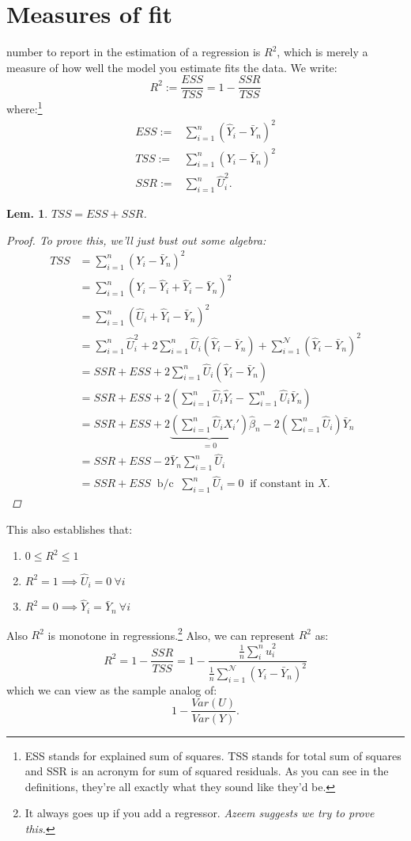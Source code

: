\documentclass{tufte-book}
\theoremstyle{mytheoremstyle}
\theoremstyle{mylemstyle}
\newtheorem*{lem}{Lem.}
\theoremstyle{mydefstyle}
\begin{document}
\section{Measures of fit}
 number to report in the estimation of a regression is \(R^2\), which is merely a measure of how well the model you estimate fits the data. We write:
	\[R^2 := \frac{ESS}{TSS} = 1- \frac{SSR}{TSS}\]
where:\footnote{ESS stands for explained sum of squares. TSS stands for total sum of squares and SSR is an acronym for sum of squared residuals. As you can see in the definitions, they're all exactly what they sound like they'd be.}
	\begin{align*}
		ESS := & \sum_{i=1}^n(\hat{Y}_i - \bar{Y}_n)^2 \\
		TSS := & \sum_{i=1}^n(Y_i - \bar{Y}_n)^2 \\
		SSR := & \sum_{i=1}^n \hat{U}_i^2  \text{.}
	\end{align*}
\begin{lem} \(TSS = ESS + SSR\).
\begin{proof}
	To prove this, we'll just bust out some algebra:
		\begin{align*}
			TSS & = \sum_{i=1}^n(Y_i - \bar{Y}_n)^2 \\
				& = \sum_{i=1}^n(Y_i - \hat{Y}_i + \hat{Y}_i - \bar{Y}_n)^2 \\
				& = \sum_{i=1}^n(\hat{U}_i + \hat{Y}_i - \bar{Y}_n)^2 \\
				& = \sum_{i=1}^n\hat{U}_i^2 + 2\sum_{i=1}^n \hat{U}_i(\hat{Y}_i - \bar{Y}_n) + \sum_{i=1}^\mathcal{N}(\hat{Y}_i - \bar{Y}_n)^2 \\
				& = SSR + ESS + 2\sum_{i=1}^n\hat{U}_i(\hat{Y}_i - \bar{Y}_n) \\
				& = SSR + ESS + 2\left(\sum_{i=1}^n\hat{U}_i\hat{Y}_i - \sum_{i=1}^n\hat{U}_i \bar{Y}_n\right) \\
				& = SSR + ESS + 2\underbrace{\left(\sum_{i=1}^n\hat{U}_iX_i'\right)}_\mathrm{=0}\hat{\beta}_n - 2\left(\sum_{i=1}^n\hat{U}_i\right)\bar{Y}_n \\
				& = SSR + ESS - 2\bar{Y}_n\sum_{i=1}^n\hat{U}_i \\
				& = SSR + ESS\ \text{ b/c }\ \sum_{i=1}^n \hat{U}_i = 0\ \text{ if constant in \(X\).}
		\end{align*}
\end{proof}
\end{lem}
\noindent This also establishes that: \begin{enumerate}
	\item \(0 \le R^2 \le 1\)
	\item \(R^2 = 1 \implies \hat{U}_i = 0\ \forall i\)
	\item \(R^2 = 0 \implies \hat{Y}_i=\bar{Y}_n\ \forall i\)
\end{enumerate}
Also \(R^2\) is monotone in regressions.\footnote{It always goes up if you add a regressor. \emph{Azeem suggests we try to prove this.}} Also, we can represent \(R^2\) as:
	\[R^2 = 1 - \frac{SSR}{TSS} = 1 - \frac{\frac{1}{n}\sum_i^n \hat{u}_i^2}{\frac{1}{n}\sum_{i=1}^\mathcal{N}(Y_i - \bar{Y}_n)^2}\]
which we can view as the sample analog of:
	\[1 - \frac{Var(U)}{Var(Y)} \text{.}\]
\end{document}
